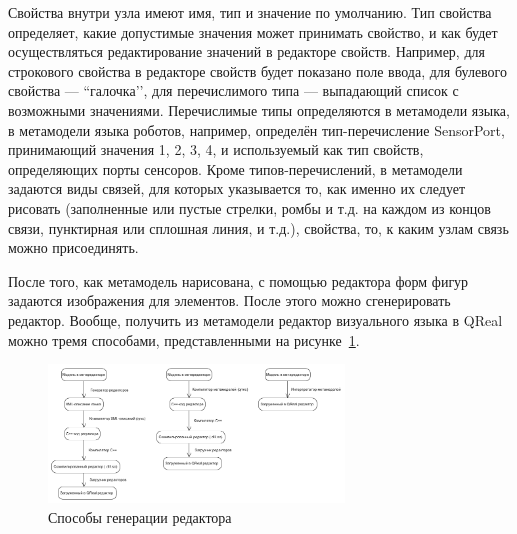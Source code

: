 \documentclass[a4paper]{article}
\begin{document}
{Свойства внутри узла имеют имя, тип и значение по умолчанию. Тип свойства определяет, какие допустимые значения может принимать свойство, и как будет осуществляться редактирование значений в редакторе свойств. Например, для строкового свойства в редакторе свойств будет показано поле ввода, для булевого свойства --- ``галочка’’, для перечислимого типа --- выпадающий список с возможными значениями. Перечислимые типы определяются в метамодели языка, в метамодели языка роботов, например, определён тип-перечисление SensorPort, принимающий значения 1, 2, 3, 4, и используемый как тип свойств, определяющих порты сенсоров. Кроме типов-перечислений, в метамодели задаются виды связей, для которых указывается то, как именно их следует рисовать (заполненные или пустые стрелки, ромбы и т.д. на каждом из концов связи, пунктирная или сплошная линия, и т.д.), свойства, то, к каким узлам связь можно присоединять.

После того, как метамодель нарисована, с помощью редактора форм фигур задаются изображения для элементов. После этого можно сгенерировать редактор. Вообще, получить из метамодели редактор визуального языка в QReal можно тремя способами, представленными на рисунке~\ref{editorGeneration}.

\begin{figure} [ht]
  \begin{center}
    \includegraphics[width=0.7\textwidth]{editorGeneration.png}
    \caption{Способы генерации редактора}
    \label{editorGeneration}
  \end{center}
\end{figure}

}
\end{document}

